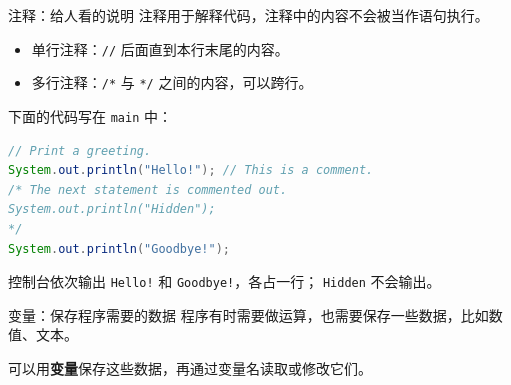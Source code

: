 \documentclass[aspectratio=169]{beamer}
\begin{document}
\begin{frame}[fragile]{注释：给人看的说明}
  注释用于解释代码，注释中的内容不会被当作语句执行。
  \begin{itemize}
    \item 单行注释：\texttt{//} 后面直到本行末尾的内容。
    \item 多行注释：\texttt{/*} 与 \texttt{*/} 之间的内容，可以跨行。
  \end{itemize}
  \medskip
  下面的代码写在 \texttt{main} 中：
  \begin{lstlisting}[language=Java]
// Print a greeting.
System.out.println("Hello!"); // This is a comment.
/* The next statement is commented out.
System.out.println("Hidden");
*/
System.out.println("Goodbye!");
  \end{lstlisting}
  控制台依次输出 \texttt{Hello!} 和 \texttt{Goodbye!}，各占一行；
  \texttt{Hidden} 不会输出。
\end{frame}



\begin{frame}[fragile]{变量：保存程序需要的数据}
  程序有时需要做运算，也需要保存一些数据，比如数值、文本。
  \par\medskip
  可以用\textbf{变量}保存这些数据，再通过变量名读取或修改它们。

\end{frame}
\end{document}
